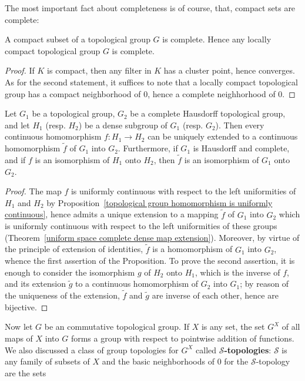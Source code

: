 The most important fact about completeness is of course, that, compact sets are complete:
\begin{proposition}\label{topological group compact is complete}
A compact subset of a topological group $G$ is complete. Hence any locally compact topological group $G$ is complete.
\end{proposition}
\begin{proof}
If $K$ is compact, then any filter in $K$ has a cluster point, hence converges. As for the second statement, it suffices to note that a locally compact topological group has a compact neighborhood of $0$, hence a complete neighhorhood of $0$.
\end{proof}
\begin{proposition}\label{topological group complete Hausdorff into extension}
Let $G_1$ be a topological group, $G_2$ be a complete Hausdorff topological group, and let $H_1$ (resp. $H_2$) be a dense subgroup of $G_1$ (resp. $G_2$). Then every continuous homomorphism $f:H_1\to H_2$ can be uniquely extended to a continuous homomorphism $\tilde{f}$ of $G_1$ into $G_2$. Furthermore, if $G_1$ is Hausdorff and complete, and if $f$ is an isomorphism of $H_1$ onto $H_2$, then $\tilde{f}$ is an isomorphism of $G_1$ onto $G_2$.
\end{proposition}
\begin{proof}
The map $f$ is uniformly continuous with respect to the left uniformities of $H_1$ and $H_2$ by Proposition~\ref{topological group homomorphism is uniformly continuous}, hence admits a unique extension to a mapping $\tilde{f}$ of $G_1$ into $G_2$ which is uniformly continuous with respect to the left uniformities of these groups (Theorem~\ref{uniform space complete dense map extension}). Moreover, by virtue of the principle of extension of identities, $\tilde{f}$ is a homomorphism of $G_1$ into $G_2$, whence the first assertion of the Proposition. To prove the second assertion, it is enough to consider the isomorphism $g$ of $H_2$ onto $H_1$, which is the inverse of $f$, and its extension $\tilde{g}$ to a continuous homomorphism of $G_2$ into $G_1$; by reason of the uniqueness of the extension, $\tilde{f}$ and $\tilde{g}$ are inverse of each other, hence are bijective.
\end{proof}
Now let $G$ be an commutative topological group. If $X$ is any set, the set $G^X$ of all maps of $X$ into $G$ forms a group with respect to pointwise addition of functions. We also discussed a class of group topologies for $G^X$ called \textbf{$\mathcal{S}$-topologies}: $\mathcal{S}$ is any family of subsets of $X$ and the basic neighborhoods of $0$ for the $\mathcal{S}$-topology are the sets
